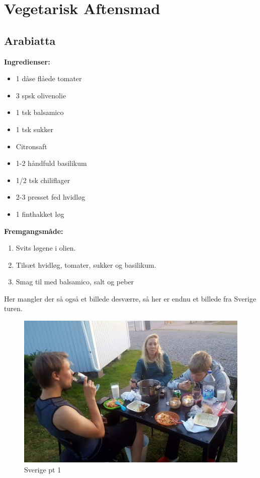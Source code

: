 \documentclass{book}
\begin{document}
\chapter{Vegetarisk Aftensmad}
\minitoc 
\newpage \section{Arabiatta}
\begin{minipage}[t]{0.5\textwidth}
\textbf{Ingredienser:}
\begin{itemize}
    \item 1 dåse flåede tomater
    \item 3 spsk olivenolie
    \item 1 tsk balsamico
    \item 1 tsk sukker
    \item Citronsaft
    \item 1-2 håndfuld basilikum
    \item 1/2 tsk chiliflager 
    \item 2-3 presset fed hvidløg
    \item 1 finthakket løg
\end{itemize}
\end{minipage}
\begin{minipage}[t]{0.5\textwidth}
\textbf{Fremgangsmåde:}
\begin{enumerate}
    \item Svits løgene i olien.
    \item Tilsæt hvidløg, tomater, sukker og basilikum.
    \item Smag til med balsamico, salt og peber
\end{enumerate}
\end{minipage}
\newpage Her mangler der så også et billede desværre, så her er endnu et billede fra Sverige turen.
\begin{figure}
    \centering
    \includegraphics[width=0.5\linewidth]{Sverigept1.jpg}
    \caption{Sverige pt 1}
    
\end{figure}
\end{document}
